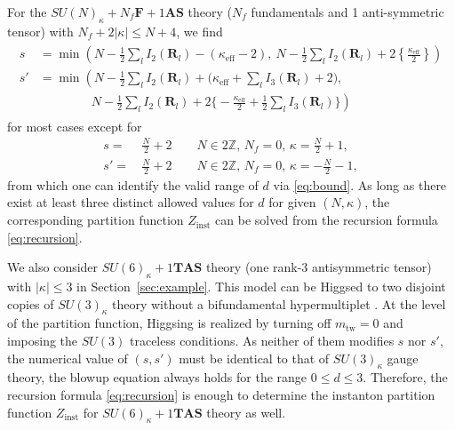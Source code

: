 \documentclass[letterpaper, 11pt]{article}
\newcommand{\nn}{\nonumber}
\def\k{\kappa}
\begin{document}
{For the $SU(N)_\kappa + N_f\mathbf{F} + 1\mathbf{AS}$ theory ($N_f$ fundamentals and 1 anti-symmetric tensor) with $N_f + 2|\kappa| \leq N+4$, we find
\begin{align}
  \label{eq:sun-nf-na}
  \begin{split}
  s &= \min  
  \left(N - \frac{1}{2} \sum_{l}I_2(\mathbf{R}_l) - (\k_\text{eff}-2),\ N - \frac{1}{2} \sum_{l}I_2(\mathbf{R}_l) + 2 \left\{\frac{\k_\text{eff}}{2}\right\}\right) \\
  s' &= \min  
  \left(N - \frac{1}{2} \sum_{l}I_2(\mathbf{R}_l) + \Big(\k_\text{eff}+\sum_{l}I_3(\mathbf{R}_l)+2\Big),\right. \\& \left. \qquad \qquad \  N - \frac{1}{2} \sum_{l}I_2(\mathbf{R}_l) + 2\Big\{\!\!-\frac{\k_\text{eff}}{2}+\frac{1}{2}\sum_{l}I_3(\mathbf{R}_l) \Big\}\right)
  \end{split} 
\end{align} for most cases except for
\begin{align}
s=&\,\frac{N}{2}+2 \qquad N\in2\mathbb{Z},\,N_f=0,\,\kappa=\frac{N}{2}+1,\nn\\
s'=&\,\frac{N}{2}+2 \qquad N\in2\mathbb{Z},\,N_f=0,\,\kappa=-\frac{N}{2}-1,
\end{align}
from which one can identify the valid range of $d$ via \eqref{eq:bound}. 
As long as there exist at least three distinct allowed values for $d$ for given $(N, \kappa)$, the corresponding partition function $Z_{\text{inst}}$ can be solved from the recursion formula \eqref{eq:recursion}. 

We also consider $SU(6)_\kappa  + 1 \mathbf{TAS}$ theory (one rank-3 antisymmetric tensor) with $|\kappa| \leq 3$ in Section~\ref{sec:example}. This model can be Higgsed to two disjoint copies of $SU(3)_\kappa$ theory without a bifundamental hypermultiplet \cite{Hayashi:2019yxj}. At the level of the partition function, Higgsing is realized by turning off $m_\text{tw} = 0$ and imposing the $SU(3)$ traceless conditions. As neither of them modifies $s$ nor $s'$, the numerical value of $(s,s')$ must be identical to that of $SU(3)_\kappa$ gauge theory, the blowup equation always holds for the range $0\leq d \leq 3$. Therefore, the recursion formula \eqref{eq:recursion} is enough to determine the instanton partition function $Z_{\text{inst}}$ for $SU(6)_\kappa  + 1 \mathbf{TAS}$ theory as well.


}
\end{document}
